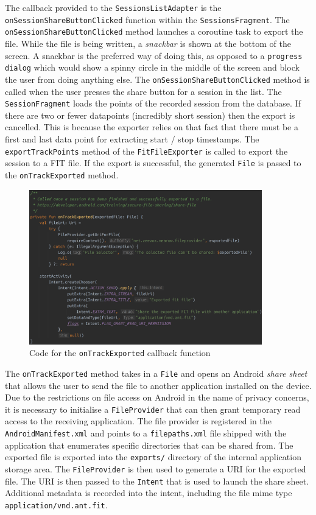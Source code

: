 \documentclass[11pt,twoside,a4paper]{report}
\begin{document}
The callback provided to the \texttt{SessionsListAdapter} is the \texttt{onSessionShareButtonClicked} function within the \texttt{SessionsFragment}. The \texttt{onSessionShareButtonClicked} method launches a coroutine task to export the file. While the file is being written, a \textit{snackbar} is shown at the bottom of the screen. A snackbar is the preferred way of doing this, as opposed to a \texttt{progress dialog} which would show a spinny circle in the middle of the screen and block the user from doing anything else. The \texttt{onSessionShareButtonClicked} method is called when the user presses the share button for a session in the list. The \texttt{SessionFragment} loads the points of the recorded session from the database. If there are two or fewer datapoints (incredibly short session) then the export is cancelled. This is because the exporter relies on that fact that there must be a first and last data point for extracting start / stop timestamps. The \texttt{exportTrackPoints} method of the \texttt{FitFileExporter} is called to export the session to a FIT file. If the export is successful, the generated \texttt{File} is passed to the \texttt{onTrackExported} method.

\begin{figure}[h!]
  \centering
  \includegraphics[width=0.9\textwidth]{code-onTrackExported.png}
  \caption{Code for the \texttt{onTrackExported} callback function}
  \label{fig:onTrackExported}
\end{figure}

The \texttt{onTrackExported} method takes in a \texttt{File} and opens an Android \textit{share sheet} that allows the user to send the file to another application installed on the device. Due to the restrictions on file access on Android in the name of privacy concerns, it is necessary to initialise a \texttt{FileProvider} that can then grant temporary read access to the receiving application. The file provider is registered in the \texttt{AndroidManifest.xml} and points to a \texttt{filepaths.xml} file shipped with the application that enumerates specific directories that can be shared from. The exported file is exported into the \texttt{exports/} directory of the internal application storage area. The \texttt{FileProvider} is then used to generate a URI for the exported file. The URI is then passed to the \texttt{Intent} that is used to launch the share sheet. Additional metadata is recorded into the intent, including the file mime type \texttt{application/vnd.ant.fit}\cite{noauthor_flexible_2020}.
\end{document}
